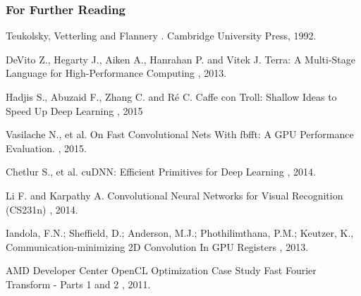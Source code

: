 \documentclass{beamer}
\begin{document}
\begin{frame}[allowframebreaks]
  \frametitle<presentation>{For Further Reading}
    
  \begin{thebibliography}{10}
    
  \beamertemplatebookbibitems

    Teukolsky, Vetterling and Flannery
    .
    \newblock Cambridge University Press, 1992.
 
    
  \beamertemplatearticlebibitems
    
    DeVito Z., Hegarty J., Aiken A., Hanrahan P. and Vitek J. 
    \newblock Terra: A Multi-Stage Language for High-Performance Computing 
    , 2013.
    
    Hadjis S.,  Abuzaid F., Zhang C. and R\'e C.
    \newblock Caffe con Troll: Shallow Ideas to Speed Up Deep Learning
     , 2015
    
    Vasilache N., et al. 
    \newblock On Fast Convolutional Nets With fbfft: A GPU Performance Evaluation.
    , 2015.
    
    Chetlur S., et al.
    \newblock cuDNN: Efficient Primitives for Deep Learning
    , 2014.
    
   Li F. and Karpathy A.
    \newblock Convolutional Neural Networks for Visual Recognition (CS231n)
    , 2014.
    
    Iandola, F.N.; Sheffield, D.; Anderson, M.J.; Phothilimthana, P.M.; Keutzer, K., 
    \newblock Communication-minimizing 2D Convolution In GPU Registers
    , 2013.
    
    AMD Developer Center
    \newblock OpenCL Optimization Case Study Fast Fourier Transform - Parts 1 and 2
    , 2011.
    
  \end{thebibliography}
\end{frame}
\end{document}
